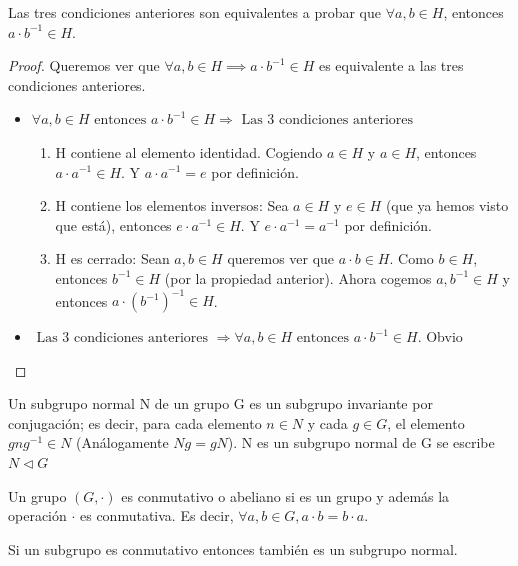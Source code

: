 \begin{prop} \label{prop:def_subgrupo2}
Las tres condiciones anteriores son equivalentes a probar que $\forall a,b \in H$, entonces $a \cdot b^{-1}  \in H$.

\begin{proof}
Queremos ver que $\forall a,b \in H \implies a \cdot b^{-1}  \in H$ es equivalente a las tres condiciones anteriores.
\begin{itemize}
\item $\forall a,b \in H \text{ entonces } a \cdot b^{-1}  \in H \Rightarrow \text{ Las 3 condiciones anteriores }$
\begin{enumerate}
 \item H contiene al elemento identidad. Cogiendo $a \in H$ y $a \in H$, entonces $a \cdot a^{-1} \in H$. Y $a \cdot a^{-1} = e$ por definición.
 \item H contiene los elementos inversos: Sea $a \in H$ y $e \in H$ (que ya hemos visto que está), entonces $e \cdot a^{-1} \in H$. Y $e \cdot a^{-1}=a^{-1}$ por definición.
 \item H es cerrado: Sean $a,b \in H$ queremos ver que $a\cdot b \in H$. Como $b \in H$, entonces $b^{-1}\in H$ (por la propiedad anterior). Ahora cogemos $a,b^{-1} \in H$ y entonces $a\cdot (b^{-1})^{-1} \in H$.
\end{enumerate}
\item $ \text{ Las 3 condiciones anteriores } \Rightarrow \forall a,b \in H \text{ entonces } a \cdot b^{-1}  \in H $. Obvio
\end{itemize}
\end{proof}
\end{prop}


\begin{defn}
	Un subgrupo normal N de un grupo G es un subgrupo invariante por conjugación; es decir, para cada elemento $n \in N$ y cada $g \in G$, el elemento $gng^{-1} \in N$ (Análogamente $Ng = gN$). N es un subgrupo normal de G se escribe $N \triangleleft G$
\end{defn}

\begin{defn}
Un grupo $(G,\cdot)$ es conmutativo o abeliano si es un grupo y además la operación $\cdot$ es conmutativa. Es decir, $\forall a,b \in G, a\cdot b = b \cdot a$.
\end{defn}

\obs Si un subgrupo es conmutativo entonces también es un subgrupo normal.

